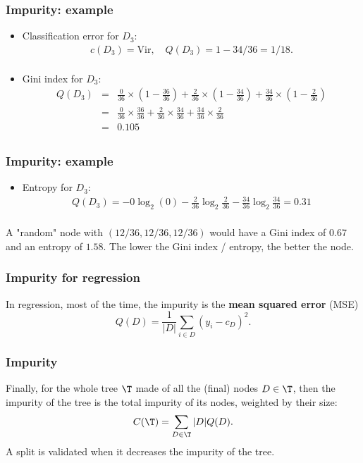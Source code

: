 \begin{frame}
\frametitle{Impurity: example}
\begin{itemize}
\item Classification error for $D_3$:  
\begin{eqnarray*}
c(D_3)= \mbox{Vir}, \quad Q(D_3)= 1 - 34/36 = 1/18.\\
\end{eqnarray*}
\item Gini index for $D_3$:
\begin{eqnarray*}
Q(D_3)&=& \frac{0}{36}\times\left(1-\frac{36}{36}\right) + \frac{2}{36}\times\left(1-\frac{34}{36}\right) + \frac{34}{36}\times \left(1-\frac{2}{36}\right)\\
&=& \frac{0}{36}\times\frac{36}{36} + \frac{2}{36}\times\frac{34}{36} + \frac{34}{36}\times\frac{2}{36}\\
&=& 0.105\\
\end{eqnarray*}
\end{itemize}
\end{frame}
\begin{frame}
\frametitle{Impurity: example}
\begin{itemize}
\item Entropy for $D_3$:
\begin{eqnarray*}
Q(D_3)= -0\log_2(0)-\frac{2}{36}\log_2\frac{2}{36} - \frac{34}{36}\log_2\frac{34}{36}=0.31\\
\end{eqnarray*}
\end{itemize}
A "random" node with $(12/36, 12/36, 12/36)$ would have a Gini index of $0.67$ and an entropy of $1.58$. The lower the Gini index / entropy, the better the node.
\end{frame}
\begin{frame}
\frametitle{Impurity for regression}
In regression, most of the time, the impurity is the {\bf mean squared error} (MSE)
$$
Q(D) = \frac{1}{|D|} \sum_{i\in D}(y_i - c_D)^2.
$$
\end{frame}
\begin{frame}
\frametitle{Impurity}
Finally, for the whole tree ${\T}$ made of all the (final) nodes $D \in \T$, then the impurity of the tree is the total impurity of its nodes, weighted by their size:
$$
C(\T) = \sum_{D \in \T} |D| Q(D).
$$
A split is validated when it decreases the impurity of the tree.\\
\end{frame}
